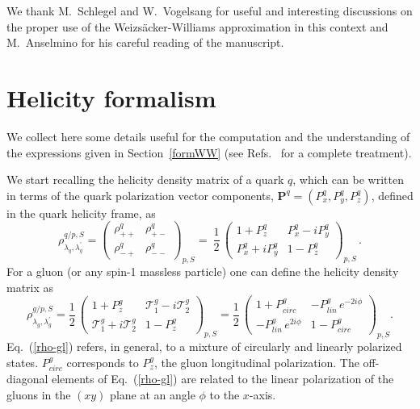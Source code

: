 \documentclass[nofootinbib,superscriptaddress,aps]{revtex4}
\newcommand{\be}{\begin{equation}}
\newcommand{\ee}{\end{equation}}
\begin{document}
\acknowledgments
We thank M.~Schlegel and W.~Vogelsang for useful and interesting discussions on the proper use of the Weizs\"acker-Williams approximation in this context and M.~Anselmino for his careful reading of the manuscript.


\appendix
\section{Helicity formalism}
\label{appendix}

We collect here some details useful for the computation and the understanding of the expressions given in Section~\ref{formWW} (see Refs.~\cite{Anselmino:2004ky,Anselmino:2005sh} for a complete treatment).

We start recalling the helicity density matrix of a quark $q$, which can be written in terms of the quark polarization vector components, $\bm{P}^q = (P^q_x, P^q_y,P^q_z)$, defined in the quark helicity frame, as
%
\be
\rho_{\lambda^{\,}_q, \lambda^{\prime}_q}^{q/p,S} =
{\left(
\begin{array}{cc}
\rho_{++}^{q} & \rho_{+-}^{q} \\
\rho_{-+}^{q} & \rho_{--}^{q}
\end{array}
\right)}_{\!\! p,S} = \>
\frac{1}{2}\,{\left(
\begin{array}{cc}
1+P^q_z & P^q_x - i P^q_y \\
 P^q_x + i P^q_y & 1-P^q_z
\end{array}
\right)}_{\!\!p,S}\,.
\label{rho-q}
\ee
For a gluon (or any spin-1 massless particle) one can define the helicity density matrix as
\be
\rho_{\lambda_g^{\,}, \lambda^{\prime}_g}^{g/p,S}=
\frac{1}{2}\,{\left(
\begin{array}{cc}
1+P_{z}^{g} &
\mathcal{T}_1^g -i\mathcal{T}_2^g \\
\mathcal{T}_1^g +i \mathcal{T}_2^g & 1-P_{z}^{g}
\end{array}
\right)}_{\!\!p,S} \!\!\!\!\!\!\!
=
\frac{1}{2}\,{\left(
\begin{array}{cc}
1+ P^g_{circ}&
- P^g_{lin} \, e^{-2i\phi}\\
- P^g_{lin} \, e^{2i\phi} & 1-P^g_{circ}
\end{array}
\right)}_{\!\!p,S} \label{rho-gl} \!.
\ee
%
Eq.~(\ref{rho-gl}) refers, in general, to a mixture of circularly and linearly
polarized states. $P_{circ}^g$ corresponds to $P_{z}^g$, the gluon longitudinal
polarization. The off-diagonal elements of Eq.~(\ref{rho-gl}) are related to
the linear polarization of the gluons in the $(xy)$ plane at an angle $\phi$
to the $x$-axis.
\end{document}
